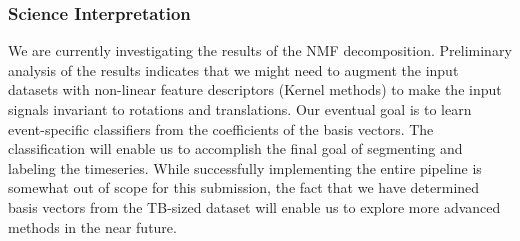 


\subsubsection{Science Interpretation}
We are currently investigating the results of the NMF decomposition. Preliminary analysis of the results indicates that we might need to augment the input datasets with non-linear feature descriptors (Kernel methods) to make the input signals invariant to rotations and translations. Our eventual goal is to learn event-specific classifiers from the coefficients of the basis vectors. The classification will enable us to accomplish the final goal of segmenting and labeling the timeseries. While successfully implementing the entire pipeline is somewhat out of scope for this submission, the fact that we have determined basis vectors from the TB-sized dataset will enable us to explore more advanced methods in the near future.

